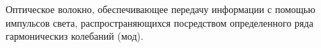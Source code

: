 Оптическое волокно, обеспечивающее передачу
информации с помощью импульсов света,
распространяющихся посредством определенного ряда
гармоническиз колебаний (мод).